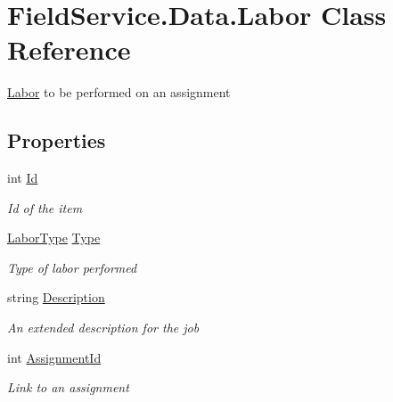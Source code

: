 \hypertarget{class_field_service_1_1_data_1_1_labor}{\section{Field\+Service.\+Data.\+Labor Class Reference}
\label{class_field_service_1_1_data_1_1_labor}
}


\hyperlink{class_field_service_1_1_data_1_1_labor}{Labor} to be performed on an assignment  


\subsection*{Properties}
\begin{DoxyCompactItemize}
\item 
int \hyperlink{class_field_service_1_1_data_1_1_labor_aa814a8dca869d92e57e18fbbed42bd94}{Id}
\begin{DoxyCompactList}\small\item\em Id of the item \end{DoxyCompactList}\item 
\hyperlink{namespace_field_service_1_1_data_a20c89d9b67c465f840b3ef27a026afd6}{Labor\+Type} \hyperlink{class_field_service_1_1_data_1_1_labor_a0a5112fedad80abd43a9f9179ae70639}{Type}
\begin{DoxyCompactList}\small\item\em Type of labor performed \end{DoxyCompactList}\item 
string \hyperlink{class_field_service_1_1_data_1_1_labor_affd6db8b708ec765161594626e22e875}{Description}
\begin{DoxyCompactList}\small\item\em An extended description for the job \end{DoxyCompactList}\item 
int \hyperlink{class_field_service_1_1_data_1_1_labor_ab4ddefede34c7053b77e2232315a36c9}{Assignment\+Id}
\begin{DoxyCompactList}\small\item\em Link to an assignment \end{DoxyCompactList}\item 

\end{DoxyCompactItemize}
